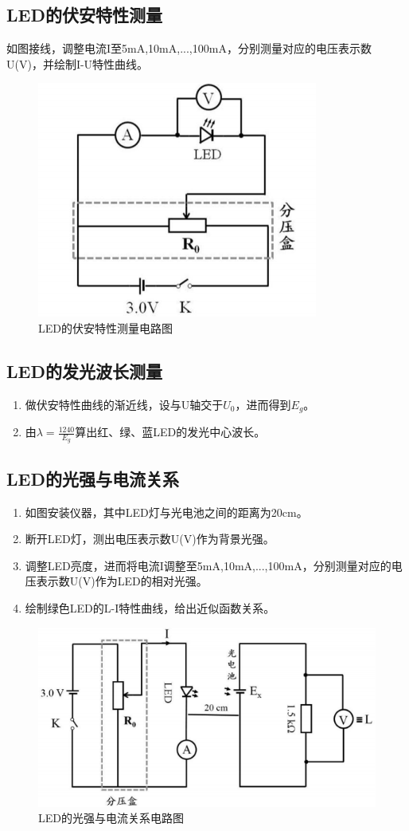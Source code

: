 \documentclass[UTF8]{ctexart}
\begin{document}
\subsection{LED的伏安特性测量}
如图接线，调整电流I至5mA,10mA,...,100mA，分别测量对应的电压表示数U(V)，并绘制I-U特性曲线。
\begin{figure}[h]
    \centering
    \includegraphics[scale=1]{伏安特性.PNG}
    \caption{LED的伏安特性测量电路图}
\end{figure}
\subsection{LED的发光波长测量}
\begin{enumerate}
    \item 做伏安特性曲线的渐近线，设与U轴交于$U_0$，进而得到$E_g$。
    \item 由$\lambda=\frac{1240}{E_g}$算出红、绿、蓝LED的发光中心波长。
\end{enumerate}
\subsection{LED的光强与电流关系}
\begin{enumerate}
    \item 如图安装仪器，其中LED灯与光电池之间的距离为20cm。
    \item 断开LED灯，测出电压表示数U(V)作为背景光强。
    \item 调整LED亮度，进而将电流I调整至5mA,10mA,...,100mA，分别测量对应的电压表示数U(V)作为LED的相对光强。
    \item 绘制绿色LED的L-I特性曲线，给出近似函数关系。
\end{enumerate}
\begin{figure}[h]
    \centering
    \includegraphics[scale=1]{光强与电流关系.PNG}
    \caption{LED的光强与电流关系电路图}
\end{figure}
\end{document}
